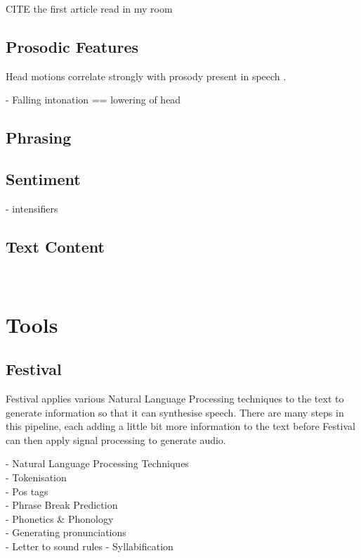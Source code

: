 \documentclass[bsc,frontabs,twoside,singlespacing,parskip]{infthesis}
\begin{document}
 CITE the first article read in my room
\cite{first_paper} \\
\subsection{Prosodic Features}

Head motions correlate strongly with prosody present in speech \cite{vis_prosody}.

- Falling intonation == lowering of head\\


\cite{kendon}
\subsection{Phrasing}
\subsection{Sentiment}
- intensifiers
\cite{emotion_head_motion}

\subsection{Text Content}

\cite{kendon} \\


\section{Tools}

\subsection{Festival}

Festival applies various Natural Language Processing techniques to the text to generate information  so that it can synthesise speech.  There are many steps in this pipeline, each adding a little bit more information to the text before Festival can then apply signal processing to generate audio. 

- Natural Language Processing Techniques \\
- Tokenisation \\
- Pos tags \\
- Phrase Break Prediction \\
- Phonetics \& Phonology \\
- Generating pronunciations \\
- Letter to sound rules
- Syllabification
\end{document}

